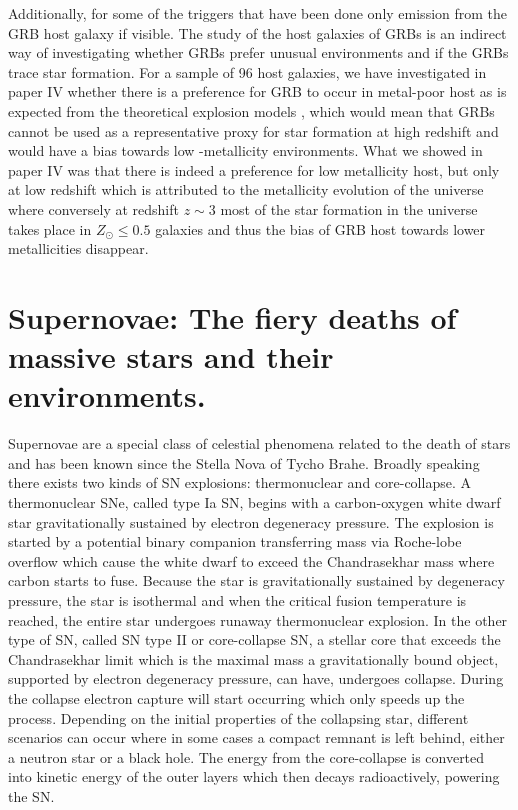 Additionally, for some of the triggers that have been done only emission from
the GRB host galaxy if visible. The study of the host galaxies of GRBs is an
indirect way of investigating whether GRBs prefer unusual environments and if
the GRBs trace star formation. For a sample of 96 host galaxies, we have
investigated in paper IV \citep{Kruhler2015} whether there is a preference for
GRB to occur in metal-poor host as is expected from the theoretical explosion
models \citep{Woosley1993}, which would mean that GRBs cannot be used as a
representative proxy for star formation at high redshift and would have a bias
towards low -metallicity environments. What we showed in paper IV was that there
is indeed a preference for low metallicity host, but only at low redshift which
is attributed to the metallicity evolution of the universe where conversely at
redshift $z \sim 3$ most of the star formation in the universe takes place in
$Z_\odot \leq 0.5$ galaxies and thus the bias of GRB host towards lower
metallicities disappear.


\section{Supernovae: The fiery deaths of massive stars and their environments.}
\label{sec:intro:sn}


Supernovae are a special class of celestial phenomena related to the death of
stars and has been known since the Stella Nova of Tycho Brahe. Broadly speaking
there exists two kinds of SN explosions: thermonuclear and core-collapse. A
thermonuclear SNe, called type Ia SN, begins with a carbon-oxygen white dwarf
star gravitationally sustained by electron degeneracy pressure. The explosion is
started by a potential binary companion transferring mass via Roche-lobe
overflow which cause the white dwarf to exceed the Chandrasekhar mass where
carbon starts to fuse. Because the star is gravitationally sustained by
degeneracy pressure, the star is isothermal and when the critical fusion
temperature is reached, the entire star undergoes runaway thermonuclear
explosion. In the other type of SN, called SN type II or core-collapse SN, a
stellar core that exceeds the Chandrasekhar limit which is the maximal mass a
gravitationally bound object, supported by electron degeneracy pressure, can
have, undergoes collapse. During the collapse electron capture will start
occurring which only speeds up the process. Depending on the initial properties
of the collapsing star, different scenarios can occur where in some cases a
compact remnant is left behind, either a neutron star or a black hole. The
energy from the core-collapse is converted into kinetic energy of the outer
layers which then decays radioactively, powering the SN.


